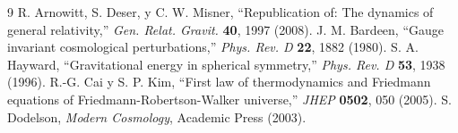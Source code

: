 \documentclass[12pt,a4paper]{article}
\begin{document}
\begin{thebibliography}{9}
 R. Arnowitt, S. Deser, y C. W. Misner, ``Republication of: The dynamics of general relativity,'' \textit{Gen. Relat. Gravit.} \textbf{40}, 1997 (2008).
 J. M. Bardeen, ``Gauge invariant cosmological perturbations,'' \textit{Phys. Rev. D} \textbf{22}, 1882 (1980).
 S. A. Hayward, ``Gravitational energy in spherical symmetry,'' \textit{Phys. Rev. D} \textbf{53}, 1938 (1996).
 R.-G. Cai y S. P. Kim, ``First law of thermodynamics and Friedmann equations of Friedmann-Robertson-Walker universe,'' \textit{JHEP} \textbf{0502}, 050 (2005).
 S. Dodelson, \textit{Modern Cosmology}, Academic Press (2003).
\end{thebibliography}
\end{document}
